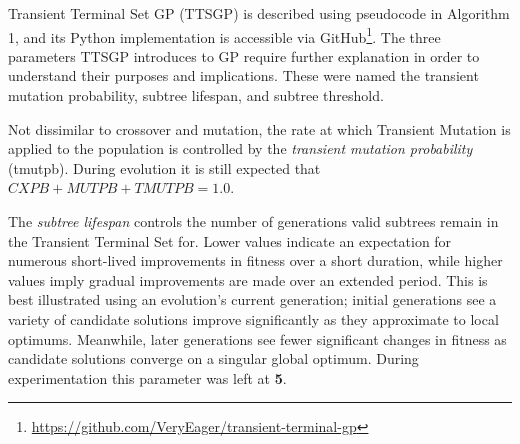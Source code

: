 \documentclass[a4paper, twocolumn]{article}
\begin{document}
Transient Terminal Set GP (TTSGP) is described using pseudocode in Algorithm 1, and its Python implementation is accessible via GitHub\footnote[1]{\url{https://github.com/VeryEager/transient-terminal-gp}}. The three parameters TTSGP introduces to GP require further explanation in order to understand their purposes and implications. These were named the transient mutation probability, subtree lifespan, and subtree threshold.

Not dissimilar to crossover and mutation, the rate at which Transient Mutation is applied to the population is controlled by the \textit{transient mutation probability} (tmutpb). During evolution it is still expected that $CXPB + MUTPB + TMUTPB = 1.0$.

The \textit{subtree lifespan} controls the number of generations valid subtrees remain in the Transient Terminal Set for. Lower values indicate an expectation for numerous short-lived improvements in fitness over a short duration, while higher values imply gradual improvements are made over an extended period. This is best illustrated using an evolution's current generation; initial generations see a variety of candidate solutions improve significantly as they approximate to local optimums. Meanwhile, later generations see fewer significant changes in fitness as candidate solutions converge on a singular global optimum. During experimentation this parameter was left at \textbf{5}.
\end{document}
